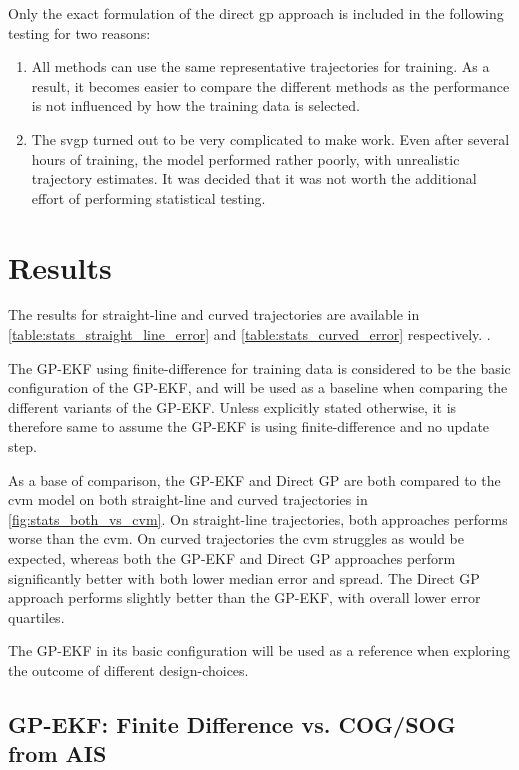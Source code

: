 Only the exact formulation of the direct \acrshort{gp} approach is included in the following testing for two reasons:
\begin{enumerate}
    \item All methods can use the same representative trajectories for training. As a result, it becomes easier to compare the different methods as the performance is not influenced by how the training data is selected.
    \item The \acrshort{svgp} turned out to be very complicated to make work. Even after several hours of training, the model performed rather poorly, with unrealistic trajectory estimates. It was decided that it was not worth the additional effort of performing statistical testing.
\end{enumerate}

\section{Results}
The results for straight-line and curved trajectories are available in \cref{table:stats_straight_line_error} and \cref{table:stats_curved_error} respectively. .

The GP-EKF using finite-difference for training data is considered to be the basic configuration of the GP-EKF, and will be used as a baseline when comparing the different variants of the GP-EKF. Unless explicitly stated otherwise, it is therefore same to assume the GP-EKF is using finite-difference and no update step.

As a base of comparison, the GP-EKF and Direct GP are both compared to the \acrshort{cvm} model on both straight-line and curved trajectories in \cref{fig:stats_both_vs_cvm}. On straight-line trajectories, both approaches performs worse than the \acrshort{cvm}. On curved trajectories the \acrshort{cvm} struggles as would be expected, whereas both the GP-EKF and Direct GP approaches perform significantly better with both lower median error and spread. The Direct GP approach performs slightly better than the GP-EKF, with overall lower error quartiles.

The GP-EKF in its basic configuration will be used as a reference when exploring the outcome of different design-choices.

\subsection{GP-EKF: Finite Difference vs. COG/SOG from AIS}

